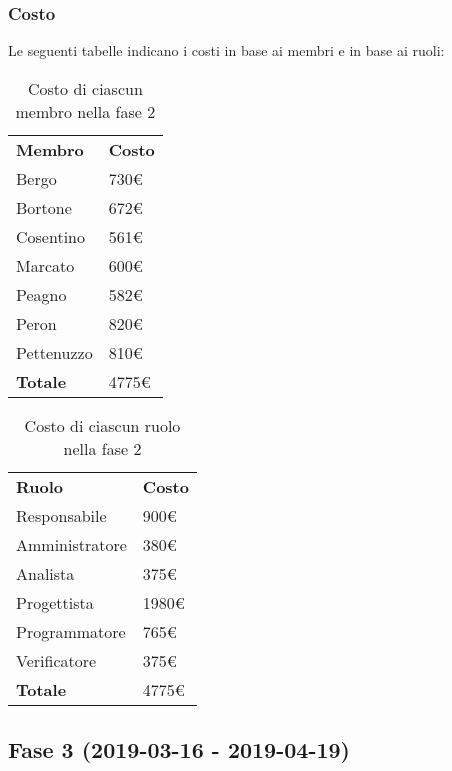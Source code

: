 	\subsubsection{Costo}
		Le seguenti tabelle indicano i costi in base ai membri e in base ai ruoli:	
		\begin{table}[h]
			\centering
			\begin{tabular}{| l | l |}
				\rowcolor{LightBlue}
				\textbf{\color{white}Membro}
				& \textbf{\color{white}Costo}\\
			
				Bergo				& 730€\\
				Bortone			& 672€\\
				Cosentino		& 561€\\
				Marcato			& 600€\\
				Peagno				& 582€\\
				Peron				& 820€\\
				Pettenuzzo		& 810€\\ \hline
				\textbf{Totale} & 4775€\\ \hline
			\end{tabular}
			\caption{Costo di ciascun membro nella fase 2}
		\end{table}
		
		\begin{table}[h]
			\centering
			\begin{tabular}{| l | l |}
				\rowcolor{LightBlue}
				\textbf{\color{white}Ruolo}
				& \textbf{\color{white}Costo}\\
			
				Responsabile 		& 900€\\
				Amministratore 	& 380€\\
				Analista 				& 375€\\			
				Progettista 			& 1980€\\
				Programmatore 		& 765€\\
				Verificatore 		& 375€\\ \hline
				\textbf{Totale} 	& 4775€\\ \hline
			\end{tabular}		
			\caption{Costo di ciascun ruolo nella fase 2}
		\end{table}
		
\newpage
\subsection{Fase 3 (2019-03-16 - 2019-04-19)}
